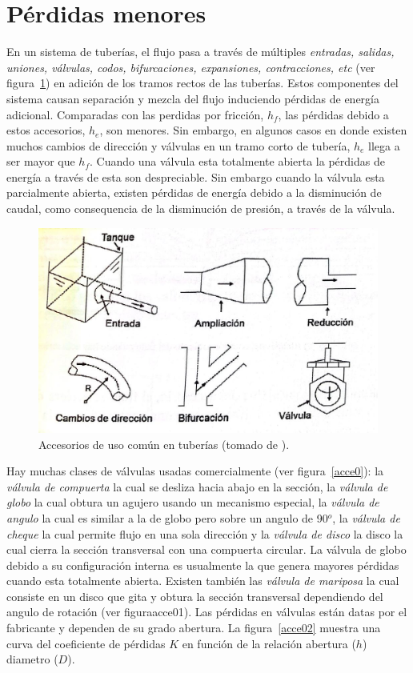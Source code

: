 \documentclass[11pt, oneside]{article}
\begin{document}
\section{P\'erdidas menores} %
En un sistema de tuber\'ias, el flujo pasa a trav\'es de m\'ultiples \emph{entradas, salidas, uniones, v\'alvulas, codos, bifurcaciones, expansiones, contracciones, etc} (ver figura~\ref{acce}) en adici\'on de los tramos rectos de las tuber\'ias. Estos componentes del sistema causan separaci\'on y mezcla del flujo induciendo p\'erdidas de energ\'ia adicional. Comparadas con las perdidas por fricci\'on, $h_f$, las p\'erdidas debido a estos accesorios, $h_e$, son menores. Sin embargo, en algunos casos en donde existen muchos cambios de direcci\'on y v\'alvulas en un tramo corto de tuber\'ia,  $h_e$ llega a ser mayor que $h_f$. Cuando una v\'alvula esta totalmente abierta la p\'erdidas de energ\'ia a trav\'es de esta son despreciable. Sin embargo cuando la v\'alvula esta parcialmente abierta, existen p\'erdidas de energ\'ia debido a la disminuci\'on de caudal, como consequencia de la disminuci\'on de presi\'on, a trav\'es de la v\'alvula. 

\begin{figure}[h]
\centering
\includegraphics[width=12cm]{acce.jpeg}
\caption{Accesorios de uso com\'un en tuber\'ias (tomado de \cite{agudelo2011mecanica}).}
\label{acce}
\end{figure}


Hay muchas clases de v\'alvulas usadas comercialmente (ver figura~\ref{acce0}): la \emph{v\'alvula de compuerta} la cual se desliza hacia abajo en la secci\'on, la \emph{v\'alvula de globo} la cual obtura un agujero usando un mecanismo especial, la \emph{v\'alvula de angulo} la cual es similar a la de globo pero sobre un angulo de 90$^o$, la \emph{v\'alvula de cheque} la cual permite flujo en una sola direcci\'on y la \emph{v\'alvula de disco} la disco la cual cierra la secci\'on transversal con una compuerta circular. La v\'alvula de globo debido a su configuraci\'on interna es usualmente la que genera mayores p\'erdidas cuando esta totalmente abierta. Existen tambi\'en las \emph{v\'alvula de mariposa} la cual consiste en un disco que gita y obtura la secci\'on transversal dependiendo del angulo de rotaci\'on (ver figura{acce01}). Las p\'erdidas en v\'alvulas est\'an datas por el fabricante y dependen de su grado abertura. La figura~\ref{acce02} muestra una curva del coeficiente de p\'erdidas $K$ en funci\'on de la relaci\'on abertura ($h$) diametro ($D$). 
\end{document}
